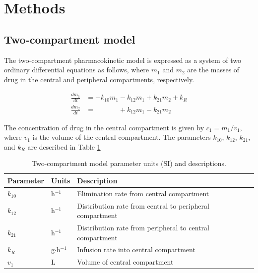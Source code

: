 \documentclass{article}\usepackage[]{graphicx}\usepackage[]{color}
\begin{document}



\section{Methods}
\subsection{Two-compartment model}
The two-compartment pharmacokinetic model is expressed as a system of two ordinary differential equations as follows, where $m_1$ and $m_2$ are the masses of drug in the central and peripheral compartments, respectively.

\begin{align}
\frac{dm_1}{dt} &= -k_{10}m_1 - k_{12}m_1 + k_{21}m_2 + k_R \nonumber \\
\frac{dm_2}{dt} &= \phantom{-k_{10}m_1} + k_{12}m_1 - k_{21}m_2 \nonumber
\end{align}

The concentration of drug in the central compartment is given by $c_1 = m_1/v_1$, where $v_1$ is the volume of the central compartment. The parameters $k_{10}$, $k_{12}$, $k_{21}$, and $k_R$ are described in Table \ref{tab:pkpars}

\begin{table}
\begin{tabular}{lll} \hline
Parameter & Units & Description \\ \hline
$k_{10}$ & h$^{-1}$ & Elimination rate from central compartment\\
$k_{12}$ & h$^{-1}$ & Distribution rate from central to peripheral compartment\\
$k_{21}$ & h$^{-1}$ & Distribution rate from peripheral to central compartment\\
$k_R$  & g$\cdot$h$^{-1}$ & Infusion rate into central compartment\\
$v_1$  & L & Volume of central compartment\\
\hline
\end{tabular}
\caption{Two-compartment model parameter units (SI) and descriptions. \label{tab:pkpars}}
\end{table}
\end{document}
